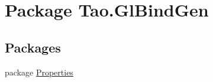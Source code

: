 \hypertarget{namespace_tao_1_1_gl_bind_gen}{
\section{Package Tao.GlBindGen}
\label{namespace_tao_1_1_gl_bind_gen}
}
\subsection*{Packages}
\begin{DoxyCompactItemize}
\item 
package \hyperlink{namespace_tao_1_1_gl_bind_gen_1_1_properties}{Properties}
\end{DoxyCompactItemize}
